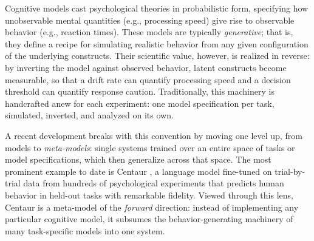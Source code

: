 
Cognitive models cast psychological theories in probabilistic form, specifying how unobservable mental quantities (e.g., processing speed) give rise to observable behavior (e.g., reaction times).
These models are typically \textit{generative}; that is, they define a recipe for simulating realistic behavior from any given configuration of the underlying constructs.
Their scientific value, however, is realized in reverse: by inverting the model against observed behavior, latent constructs become measurable, so that a drift rate can quantify processing speed and a decision threshold can quantify response caution.
Traditionally, this machinery is handcrafted anew for each experiment: one model specification per task, simulated, inverted, and analyzed on its own.

A recent development breaks with this convention by moving one level up, from models to \textit{meta-models}: single systems trained over an entire space of tasks or model specifications, which then generalize across that space.
The most prominent example to date is Centaur \citep{binz2025centaur}, a language model fine-tuned on trial-by-trial data from hundreds of psychological experiments that predicts human behavior in held-out tasks with remarkable fidelity.
Viewed through this lens, Centaur is a meta-model of the \textit{forward} direction: instead of implementing any particular cognitive model, it subsumes the behavior-generating machinery of many task-specific models into one system.

